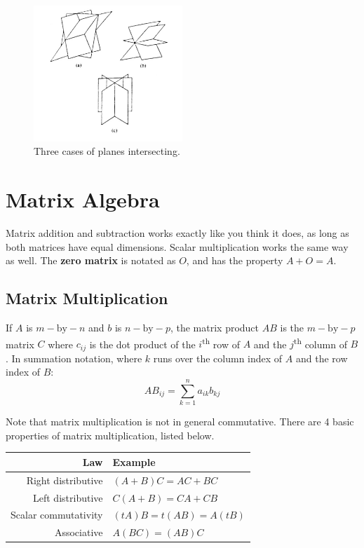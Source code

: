 \documentclass[11pt]{article}
\begin{document}
	\begin{figure}[htb]
		\centering
		\includegraphics[width=0.5\textwidth]{planarint.jpg}
		\caption{Three cases of planes intersecting.}
		\label{fig:planarint}
	\end{figure}
	
\section{Matrix Algebra}
	Matrix addition and subtraction works exactly like you think it does, as long as both matrices have equal dimensions. Scalar multiplication works the same way as well. The \textbf{zero matrix} is notated as $O$, and has the property $A + O = A$.
	
	\subsection{Matrix Multiplication}
		If $A$ is $m-\text{by}-n$ and $b$ is $n-\text{by}-p$, the matrix product $AB$ is the $m-\text{by}-p$ matrix $C$ where $c_{ij}$ is the dot product of the $i$\textsuperscript{th} row of $A$ and the $j$\textsuperscript{th} column of $B$. In summation notation, where $k$ runs over the column index of $A$ and the row index of $B$:
		\begin{equation}
			AB_{ij} = \sum_{k=1}^n a_{ik}b_{kj}
		\end{equation}
		
		Note that matrix multiplication is not in general commutative. There are 4 basic properties of matrix multiplication, listed below.
		\begin{center}
			\begin{tabular}{r|l}
				Law							& Example\\\hline
				Right distributive			& $(A+B)C = AC+BC$\\
				Left distributive			& $C(A+B) = CA+CB$\\
				Scalar commutativity		& $(tA)B=t(AB)=A(tB)$\\
				Associative					& $A(BC)=(AB)C$
			\end{tabular}
		\end{center}
		
\end{document}
